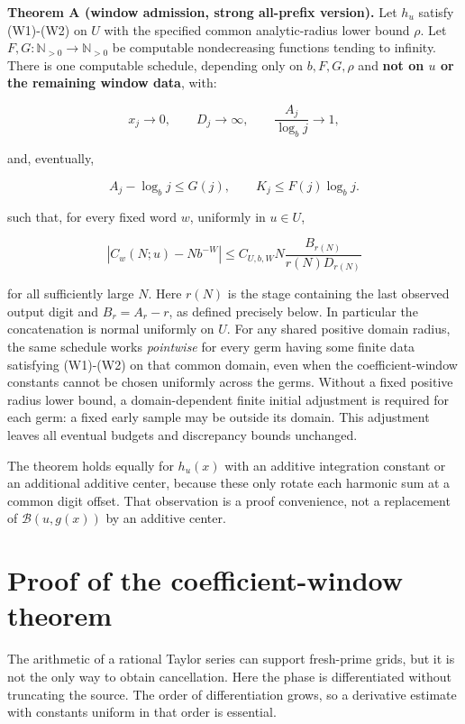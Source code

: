 \documentclass[11pt,a4paper]{article}
\begin{document}
\textbf{Theorem A (window admission, strong all-prefix version).} Let
\(h_u\) satisfy (W1)-(W2) on \(U\) with the specified common
analytic-radius lower bound \(\rho\). Let
\(F,G:\mathbb N_{>0}\longrightarrow\mathbb N_{>0}\) be computable
nondecreasing functions tending to infinity. There is one computable
schedule, depending only on \(b,F,G,\rho\) and \textbf{not on \(u\) or
the remaining window data}, with:

\[
x_j\longrightarrow0,\qquad D_j\longrightarrow\infty,\qquad \frac{A_j}{\log_bj}\longrightarrow1,
\]

and, eventually,

\[
A_j-\log_bj\le G(j),\qquad K_j\le F(j)\log_bj.
\]

such that, for every fixed word \(w\), uniformly in \(u \in U\),

\[
\left|C_w(N;u)-Nb^{-W}\right|\le C_{U,b,W}N\frac{B_{r(N)}}{r(N)D_{r(N)}}
\]

for all sufficiently large \(N\). Here \(r(N)\) is the stage containing
the last observed output digit and \(B_r=A_r-r\), as defined precisely
below. In particular the concatenation is normal uniformly on \(U\). For
any shared positive domain radius, the same schedule works
\emph{pointwise} for every germ having some finite data satisfying
(W1)-(W2) on that common domain, even when the coefficient-window
constants cannot be chosen uniformly across the germs. Without a fixed
positive radius lower bound, a domain-dependent finite initial
adjustment is required for each germ: a fixed early sample may be
outside its domain. This adjustment leaves all eventual budgets and
discrepancy bounds unchanged.

The theorem holds equally for \(h_u(x)\) with an additive integration
constant or an additional additive center, because these only rotate
each harmonic sum at a common digit offset. That observation is a proof
convenience, not a replacement of \(\mathcal B(u,g(x))\) by an additive
center.

\section{Proof of the coefficient-window
theorem}\label{proof-of-the-coefficient-window-theorem}

The arithmetic of a rational Taylor series can support fresh-prime
grids, but it is not the only way to obtain cancellation. Here the phase
is differentiated without truncating the source. The order of
differentiation grows, so a derivative estimate with constants uniform
in that order is essential.
\end{document}
